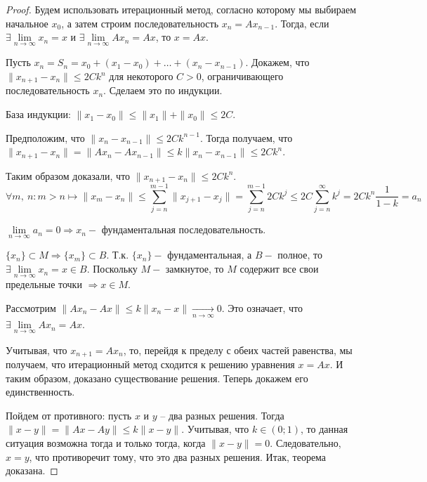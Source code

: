 \begin{proof}
	Будем использовать итерационный метод, согласно которому мы выбираем начальное $x_0$, а затем строим последовательность $x_n = Ax_{n-1}$. Тогда, если $\exists \lim\limits_{n \rightarrow \infty} x_n = x$ и $\exists \lim\limits_{n \rightarrow \infty} Ax_n = Ax$, то $x = Ax$.
	
		Пусть $x_n = S_n = x_0 + (x_1 - x_0) + \ldots + (x_n - x_{n-1})$.
		Докажем, что $\|x_{n+1} - x_n\| \leqslant 2Ck^n$ для некоторого $C > 0$, ограничивающего последовательность $x_n$. Сделаем это по индукции.
		
		База индукции: $\|x_1 - x_0\| \leqslant \|x_1\| + \|x_0\| \leqslant 2C$.
		
		Предположим, что $\|x_n - x_{n-1}\| \leqslant 2Ck^{n-1}$. Тогда получаем, что $\|x_{n+1} - x_n\| = \|Ax_n - Ax_{n-1}\| \leqslant k \|x_n - x_{n-1}\| \leqslant 2Ck^n$.
		
		Таким образом доказали, что $ \|x_{n+1} - x_n\| \leqslant 2Ck^n $.
		 $$\forall m,~ n: m > n \longmapsto \|x_m - x_n\| \leqslant \sum\limits_{j = n}^{m-1} {\|x_{j + 1} - x_j\|} = \sum\limits_{j = n}^{m-1} {2Ck^j} \leqslant 2C\sum\limits_{j = n}^{\infty} {k^j} = 2Ck^n \frac{1}{1 - k} = a_n$$
		
	$\lim\limits_{n \to \infty}{a_n} = 0 \Rightarrow x_n - $ фундаментальная последовательность.
	
	$\{x_n\} \subset M \Rightarrow \{x_m\} \subset B$. Т.к. $\{x_n\} - $ фундаментальная, а $B - $ полное, то $\exists \lim\limits_{n \rightarrow \infty} x_n = x \in B$. Поскольку $M - $ замкнутое, то $M$ содержит все свои предельные точки $\Rightarrow x \in M$.
		
		Рассмотрим $\|Ax_n - Ax\| \leqslant k\|x_n - x\| \underset{n \rightarrow \infty}{\longrightarrow} 0$. Это означает, что $\exists \lim\limits_{n \rightarrow \infty} Ax_n = Ax$. 
		
		Учитывая, что $x_{n+1} = Ax_n$, то, перейдя к пределу с обеих частей равенства, мы получаем, что итерационный метод сходится к решению уравнения $x = Ax$. И таким образом, доказано существование решения. Теперь докажем его единственность.
		
		Пойдем от противного: пусть $x$ и $y$ -- два разных решения. Тогда $\|x - y\| = \|Ax - Ay\| \leqslant k \|x - y\|$. Учитывая, что $k \in (0; 1)$, то данная ситуация возможна тогда и только тогда, когда $\|x - y\| = 0$. Следовательно, $x = y$, что противоречит тому, что это два разных решения. Итак, теорема доказана.
\end{proof}

